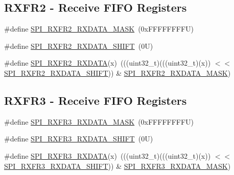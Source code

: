 \subsection*{R\+X\+F\+R2 -\/ Receive F\+I\+FO Registers}
\begin{DoxyCompactItemize}
\item 
\#define \mbox{\hyperlink{group___s_p_i___register___masks_ga659737d6e82c6f3ace0e1d568157426f}{S\+P\+I\+\_\+\+R\+X\+F\+R2\+\_\+\+R\+X\+D\+A\+T\+A\+\_\+\+M\+A\+SK}}~(0x\+F\+F\+F\+F\+F\+F\+F\+F\+U)
\item 
\#define \mbox{\hyperlink{group___s_p_i___register___masks_gac8d903abae42a6b97dcbdc5bf31b1276}{S\+P\+I\+\_\+\+R\+X\+F\+R2\+\_\+\+R\+X\+D\+A\+T\+A\+\_\+\+S\+H\+I\+FT}}~(0\+U)
\item 
\#define \mbox{\hyperlink{group___s_p_i___register___masks_ga88f81c7a0134abe2eb9dac410625fee3}{S\+P\+I\+\_\+\+R\+X\+F\+R2\+\_\+\+R\+X\+D\+A\+TA}}(x)~(((uint32\+\_\+t)(((uint32\+\_\+t)(x)) $<$$<$ \mbox{\hyperlink{group___s_p_i___register___masks_gac8d903abae42a6b97dcbdc5bf31b1276}{S\+P\+I\+\_\+\+R\+X\+F\+R2\+\_\+\+R\+X\+D\+A\+T\+A\+\_\+\+S\+H\+I\+FT}})) \& \mbox{\hyperlink{group___s_p_i___register___masks_ga659737d6e82c6f3ace0e1d568157426f}{S\+P\+I\+\_\+\+R\+X\+F\+R2\+\_\+\+R\+X\+D\+A\+T\+A\+\_\+\+M\+A\+SK}})
\end{DoxyCompactItemize}
\subsection*{R\+X\+F\+R3 -\/ Receive F\+I\+FO Registers}
\begin{DoxyCompactItemize}
\item 
\#define \mbox{\hyperlink{group___s_p_i___register___masks_ga06579b6d579b820152dd81435d71c09e}{S\+P\+I\+\_\+\+R\+X\+F\+R3\+\_\+\+R\+X\+D\+A\+T\+A\+\_\+\+M\+A\+SK}}~(0x\+F\+F\+F\+F\+F\+F\+F\+F\+U)
\item 
\#define \mbox{\hyperlink{group___s_p_i___register___masks_gaae4c2a3c38669f7a03fbcaabd29de0c7}{S\+P\+I\+\_\+\+R\+X\+F\+R3\+\_\+\+R\+X\+D\+A\+T\+A\+\_\+\+S\+H\+I\+FT}}~(0\+U)
\item 
\#define \mbox{\hyperlink{group___s_p_i___register___masks_gaa0268e30e0adb838413ec371a2afecf7}{S\+P\+I\+\_\+\+R\+X\+F\+R3\+\_\+\+R\+X\+D\+A\+TA}}(x)~(((uint32\+\_\+t)(((uint32\+\_\+t)(x)) $<$$<$ \mbox{\hyperlink{group___s_p_i___register___masks_gaae4c2a3c38669f7a03fbcaabd29de0c7}{S\+P\+I\+\_\+\+R\+X\+F\+R3\+\_\+\+R\+X\+D\+A\+T\+A\+\_\+\+S\+H\+I\+FT}})) \& \mbox{\hyperlink{group___s_p_i___register___masks_ga06579b6d579b820152dd81435d71c09e}{S\+P\+I\+\_\+\+R\+X\+F\+R3\+\_\+\+R\+X\+D\+A\+T\+A\+\_\+\+M\+A\+SK}})
\end{DoxyCompactItemize}



